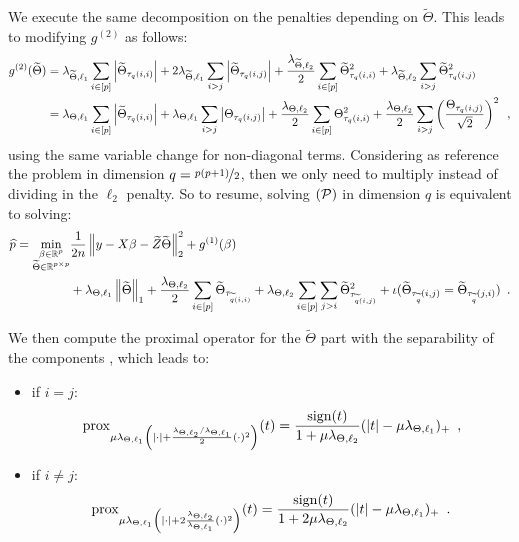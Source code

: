 \documentclass[../main.tex]{subfiles}
\begin{document}
We execute the same decomposition on the penalties depending
on $\widetilde\Theta$.
This leads to modifying $g^{(2)}$ as follows:
\begin{align*}
	g^{(2)}(\widetilde\Theta)
	&= \lambda_{\widetilde\Theta, \ell_1}
	\sum_{i\in [p]}\left \vert \widetilde\Theta_{\tau_q(i,i)} \right \vert +
		2\lambda_{\widetilde\Theta, \ell_1} \sum_{i>j}
			\left \vert \widetilde\Theta_{\tau_q(i,j)} \right \vert +
 			\frac{\lambda_{\widetilde\Theta, \ell_2}}{2}
			\sum_{i\in [p]}\widetilde\Theta_{\tau_q(i,i)}^2 +
			\lambda_{\widetilde\Theta, \ell_2}\sum_{i>j}
			\widetilde\Theta_{\tau_q(i,j)}^2 \\
 	& = \lambda_{\Theta, \ell_1} \sum_{i\in [p]}
	 	\left \vert \widetilde\Theta_{\tau_q(i,i)} \right \vert +
		\lambda_{\Theta, \ell_1} \sum_{i>j} \left \vert \Theta_{\tau_q(i,j)} \right \vert +
	 	\frac{\lambda_{\Theta, \ell_2}}{2} \sum_{i\in [p]}\Theta_{\tau_q(i,i)}^2 +
	 	\frac{\lambda_{\Theta, \ell_2}}{2}\sum_{i>j}
	 	\left(
			\frac{\Theta_{\tau_q(i,j)}}{\sqrt{2}}
		\right)^2 \enspace,
\end{align*}
using the same variable change for non-diagonal terms. Considering as reference
the problem in dimension $q=\nicefrac{p(p+1)}{2}$, then we only need to multiply
instead of dividing in the $\ell_2$ penalty.
So to resume, solving $(\mathcal{P})$ in dimension $q$ is equivalent to solving:
\begin{equation}\label{eq:equiv_full}
	\begin{split}
	\widehat{p}
	  = \min_{\substack{\beta \in \mathbb{R}^p \\
	 					\widetilde \Theta \in \mathbb{R}^{p\times p}}}
	& \frac{1}{2n}\left \lVert y - X\beta - \widetilde Z\widetilde \Theta \right \rVert_2^2 +
	g^{(1)}(\beta) \\
	& + \lambda_{\Theta, \ell_1}\left \lVert \widetilde\Theta \right \rVert_1 +
	\frac{\lambda_{\Theta, \ell_2}}{2}\sum_{i\in[p]}
	\widetilde\Theta_{\tau_{\widetilde q(i,i)}}
	 + \lambda_{\Theta, \ell_2}\sum_{i\in [p]}\sum_{j>i}
	 \widetilde \Theta_{\tau_{\widetilde q(i,j)}}^2 +
	 \iota(\widetilde \Theta_{\tau_{\widetilde q}(i,j)}
	 =\widetilde \Theta_{\tau_{\widetilde q}(j,i)})
	 \enspace.
	\end{split}
\end{equation}

We then compute the proximal operator for the $\widetilde\Theta$ part with the
separability of the components \citep[p.~135]{Beck17}, which
leads to:
\begin{itemize}
	\item if $i=j$:
	\[\operatorname{prox}_{\mu\lambda_{\Theta, \ell_1}\left(|\cdot| +
	\frac{\lambda_{\Theta, \ell_2}/
		\lambda_{\Theta, \ell_1}}{2}(\cdot)^2\right)}(t)
		=\frac{\operatorname{sign}(t)}{1+\mu\lambda_{\Theta, \ell_2}}
		(|t| - \mu\lambda_{\Theta, \ell_1})_+ \enspace,\]
	\item if $i\neq j$:
	\[\operatorname{prox}_{\mu\lambda_{\Theta, \ell_1}\left(|\cdot| +
	2\frac{\lambda_{\Theta, \ell_2}}{
		\lambda_{\Theta,\ell_1}}(\cdot)^2\right)}(t)
		=\frac{\operatorname{sign}(t)}{1+2\mu\lambda_{\Theta, \ell_2}}
		(|t| - \mu\lambda_{\Theta, \ell_1})_+ \enspace.\]
\end{itemize}
\end{document}
